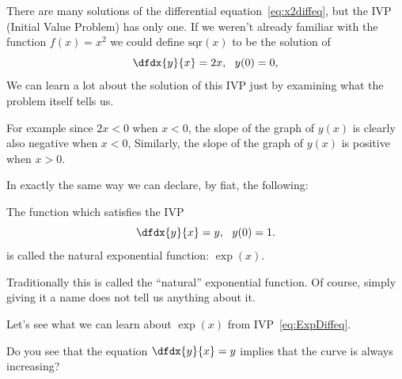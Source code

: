 There are many solutions of the differential
equation~\ref{eq:x2diffeq}, but the IVP (Initial Value Problem)
has only one. If we weren't already familiar with the function
$f(x)=x^2$ we could define $\text{sqr}(x)$ to be the solution of
\begin{equation}
\dfdx{y}{x}=2x, \ \ y(0)=0,\label{eq:ExpDiffeq2}
\end{equation}
We can learn a lot about the solution of this IVP just
by examining what the problem itself tells us.

For example since $2x<0$ when $x<0$, the slope of the graph of $y(x)$
is clearly also negative when $x<0$, Similarly, the slope of the graph
of $y(x)$ is positive when $x>0$.

In exactly the same way we can declare, by fiat, the following:\\
\begin{mydefinition}
  \label{def:natural-exponential}
  The function which satisfies the IVP
  \begin{equation}
    \label{eq:ExpDiffeq}
    \dfdx{y}{x}=y, \ \ y(0)=1.
  \end{equation}
  is called the natural exponential  function: $\exp(x)$.
\end{mydefinition}
Traditionally this is called the ``natural''
exponential function.  Of course, simply giving it a name does not
tell us anything about it.

Let's see what we can learn about $\exp(x)$ from
IVP~\ref{eq:ExpDiffeq}.

Do you see that the equation
$\dfdx{y}{x}=y$ implies that the curve is always increasing?

